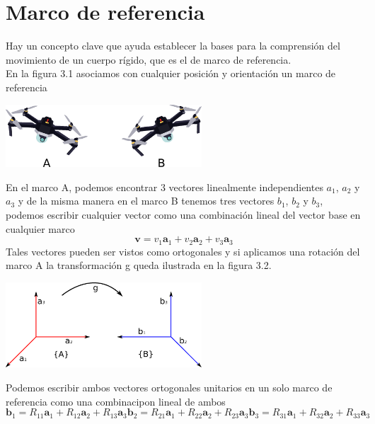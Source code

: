 \section{Marco de referencia}
Hay un concepto clave que ayuda establecer la bases para la comprensión del movimiento de
un cuerpo rígido, que es el de marco de referencia.\\
En la figura 3.1 asociamos con cualquier posición y orientación un marco de referencia
\begin{center}
	\includegraphics[width=0.55\textwidth]{Contenido/Cuerpo/Capitulo3/Fig10.eps}
	\label{fig:ModeloMat:Fig1}
\end{center}
En el marco A, podemos encontrar 3 vectores linealmente independientes $a_1$, $a_2$ y $a_3$
y de la misma manera en el marco B tenemos tres vectores $b_1$, $b_2$ y $b_3$, podemos
escribir cualquier vector como una combinación lineal del vector base en cualquier marco
\begin{equation}
	\textbf{v} = v_1 \textbf{a}_1 + v_2 \textbf{a}_2 + v_3 \textbf{a}_3
\end{equation}
Tales vectores pueden ser vistos como ortogonales y si aplicamos una rotación del marco A
la transformación g queda ilustrada en la figura 3.2.
\begin{center}
	\includegraphics[width=0.55\textwidth]{Contenido/Cuerpo/Capitulo3/Fig11.eps}
	\label{fig:ModeloMat:Fig1}
\end{center}
Podemos escribir ambos vectores ortogonales unitarios en un solo marco de referencia como
una combinacipon lineal de ambos
\begin{subequations}
	\begin{equation}
		\textbf{b}_1 = R_{11}\textbf{a}_1 + R_{12}\textbf{a}_2 + R_{13}\textbf{a}_3
	\end{equation}
	\begin{equation}
		\textbf{b}_2 = R_{21}\textbf{a}_1 + R_{22}\textbf{a}_2 + R_{23}\textbf{a}_3
	\end{equation}
	\begin{equation}
		\textbf{b}_3 = R_{31}\textbf{a}_1 + R_{32}\textbf{a}_2 + R_{33}\textbf{a}_3
	\end{equation}
\end{subequations}
